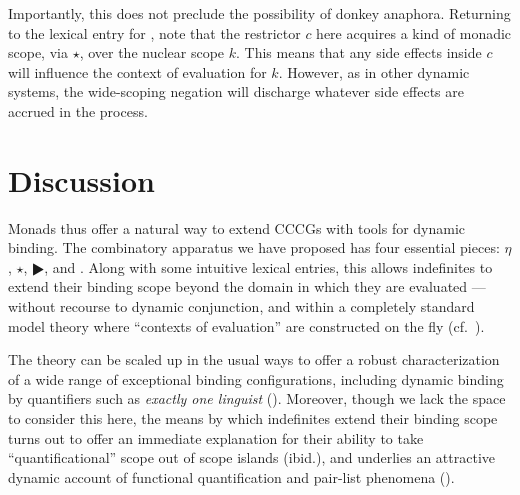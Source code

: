   Importantly, this does not preclude the possibility of donkey anaphora. Returning to the lexical entry for , note that the restrictor $c$ here acquires a kind of monadic scope, via $\star$, over the nuclear scope $k$. This means that any side effects inside $c$ will influence the context of evaluation for $k$. However, as in other dynamic systems, the wide-scoping negation will discharge whatever side effects are accrued in the process. %

\section{Discussion}
	Monads thus offer a natural way to extend CCCGs with tools for dynamic binding. The combinatory apparatus we have proposed has four essential pieces: $\eta$, $\star$, $\RHD$, and . Along with some intuitive lexical entries, this allows indefinites to extend their binding scope beyond the domain in which they are evaluated --- without recourse to dynamic conjunction, and within a completely standard model theory where ``contexts of evaluation'' are constructed on the fly (cf.~\citealt{Eijck:2001, Groote:2006}).%

	
	The theory can be scaled up in the usual ways to offer a robust characterization of a wide range of exceptional binding configurations, including dynamic binding by quantifiers such as \emph{exactly one linguist} (\citealt{Charlow:diss}). Moreover, though we lack the space to consider this here, the means by which indefinites extend their binding scope turns out to offer an immediate explanation for their ability to take ``quantificational'' scope out of scope islands (ibid.), and underlies an attractive dynamic account of functional quantification and pair-list phenomena (\citealt{Bumford:inc}). %
	
